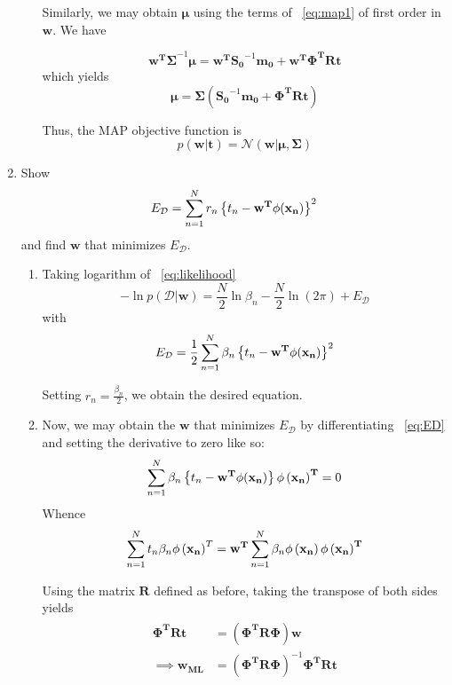 \documentclass[reqno]{amsart}
\begin{document}
\begin{enumerate}[label=\textbf{(\Roman*)}]
\begin{enumerate}[label=\textbf{(\alph*)}]
                Similarly, we may obtain \(\boldsymbol{\mu}\) using the terms of ~\eqref{eq:map1} of first order in \(\mathbf{w}\). We have

                \[\mathbf{w^T \Sigma}^{-1} \boldsymbol{\mu} = \mathbf{w^T} \mathbf{S_0}^{-1} \mathbf{m_0} + \mathbf{w^T \Phi^T R t}\]
                    which yields
                \[\boldsymbol{\mu} = \boldsymbol{\Sigma} (\mathbf{S_0}^{-1} \mathbf{m_0} + \mathbf{\Phi^T R t})\]

                Thus, the MAP objective function is \[p(\mathbf{w|t}) = \mathcal{N} (\mathbf{w|\boldsymbol{\mu}, \Sigma})\]
                
        \end{enumerate}

        

        \item \question Show \[E_\mathcal{D} = \sum_{n = 1}^{N} r_n \left\{t_n - \mathbf{w^T \phi(x_n)}\right\}^2 \] and find \(\mathbf{w}\) that minimizes \(E_\mathcal{D}\).
        \solution
        \begin{enumerate}[label=\textbf{(\alph*)}]
            \item Taking logarithm of ~\eqref{eq:likelihood}
            \[-\ln p(\mathcal{D} | \mathbf{w}) = \frac{N}{2} \ln \beta_n - \frac{N}{2} \ln (2\pi) + E_\mathcal{D}\]
            with
            \begin{equation}
                E_\mathcal{D} = \frac{1}{2} \sum_{n = 1}^{N} \beta_n \left\{t_n - \mathbf{w^T \phi(x_n)}\right\}^2 \label{eq:ED}
            \end{equation}
    
            Setting \(r_n = \frac{\beta_n}{2}\), we obtain the desired equation.

            \item Now, we may obtain the \(\mathbf{w}\) that minimizes \(E_\mathcal{D}\) by differentiating ~\eqref{eq:ED} and setting the derivative to zero like so:
        \[\sum_{n = 1}^{N} \beta_n \left\{t_n - \mathbf{w^T \phi(x_n)}\right\} \mathbf{\phi\left(x_n\right)^T} = 0\]
        Whence 
        \[ \sum_{n = 1}^{N} t_n \beta_n \mathbf{\phi\left(x_n\right)}^T = \mathbf{w^T}\sum_{n = 1}^{N} \beta_n \mathbf{\phi\left(x_n\right)\phi\left(x_n\right)^T}\]

        Using the matrix \(\mathbf{R}\) defined as before, taking the transpose of both sides yields
        \begin{align}
            \begin{split}
                \mathbf{\Phi^T R t} &= \mathbf{(\Phi^T R \Phi) w} \\
                \implies \mathbf{w_{ML}} &= (\mathbf{\Phi^T R \Phi})^{-1} \mathbf{\Phi^T R t}
            \end{split}
        \end{align}
        \end{enumerate}
        
    \end{enumerate}
\end{document}
